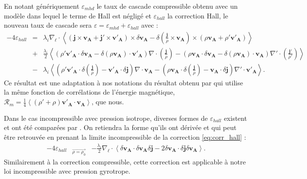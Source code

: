 En notant génériquement $\varepsilon_{mhd}$ le taux de cascade compressible obtenu avec un modèle dans lequel le terme de \acs{Hall} est négligé et $\varepsilon_{hall}$ la correction \acs{Hall}, le nouveau taux de cascade sera $\varepsilon = \varepsilon_{mhd} + \varepsilon_{hall}$ avec  :
\begin{equation}
\label{eq:corr_hall} \boxed{
\begin{array}{lcl}
    -4\varepsilon_{hall} &=& \lambda_i\nabla_{\boldsymbol{\ell}} \cdot \left< \left(\boldsymbol{j}  \times \boldsymbol{v_A}+ \boldsymbol{j'}  \times \boldsymbol{v'_A}\right)\times \delta \boldsymbol{v_A} - \delta \left(\frac{\boldsymbol{j}}{\rho}  \times \boldsymbol{v_A}\right)\times \left(\rho \boldsymbol{v_A}+ \rho' \boldsymbol{v'_A}\right)\right> \\
    &+& \frac{\lambda_i}{2} \left< \left(\rho' \boldsymbol{v'_A} \cdot \delta \boldsymbol{v_A}- \delta \left(\rho \boldsymbol{v_A}\right) \cdot \boldsymbol{v'_A} \right)\nabla \cdot \left(\frac{\boldsymbol{j}}{\rho}\right) - \left(\rho \boldsymbol{v_A} \cdot \delta \boldsymbol{v_A}- \delta \left(\rho \boldsymbol{v_A}\right) \cdot \boldsymbol{v_A} \right) \nabla' \cdot \left(\frac{\boldsymbol{j'}}{\rho'}\right)\right> \\%
    &-& \lambda_i \left< \left(\rho' \boldsymbol{v'_A} \cdot \delta \left(\frac{\boldsymbol{j}}{\rho}\right)- \boldsymbol{v'_A} \cdot \delta \boldsymbol{j}  \right)\nabla \cdot \boldsymbol{v_A} - \left(\rho \boldsymbol{v_A} \cdot \delta \left(\frac{\boldsymbol{j}}{\rho}\right)- \boldsymbol{v_A} \cdot \delta \boldsymbol{j}  \right)\nabla' \cdot \boldsymbol{v'_A}\right> .
   \end{array}}
\end{equation} 
Ce résultat est une adaptation à nos notations du résultat obtenu par \cite{andres_exact_2018} qui utilise la même fonction de corrélations de l'énergie magnétique, $\mathcal{R}_{m} = \frac{1}{4}\left<\left(\rho'+\rho\right)\boldsymbol{v'_A} \cdot \boldsymbol{v_A}\right>$, que nous.

Dans le cas incompressible avec pression isotrope, diverses formes de $\varepsilon_{hall}$ existent et ont été comparées par \cite{ferrand_exact_2019}. 
On retiendra la forme qu'ils ont dérivée et qui peut être retrouvée en prenant la limite incompressible de la correction \eqref{eq:corr_hall} :
\begin{equation}
\label{eq:corr_hallinc} \boxed{
\begin{array}{lcl}
    -4 \varepsilon_{hall} &{}_{\overrightarrow{\rho = \rho_0}}&  -\frac{\lambda_i}{2} \nabla_{\boldsymbol{\ell}} \cdot \left<\delta \boldsymbol{v_A} \cdot \delta \boldsymbol{v_A}\delta \boldsymbol{j} - 2 \delta \boldsymbol{v_A} \cdot \delta \boldsymbol{j} \delta \boldsymbol{v_A}\right> . %
   \end{array}}
\end{equation} 
Similairement à la correction compressible, cette correction est applicable à notre loi incompressible avec pression gyrotrope. 

